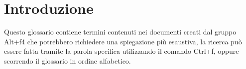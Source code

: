 \documentclass[a4paper,12pt]{article}
\begin{document}
\section*{Introduzione}
\label{sec:introduzione}
Questo glossario contiene termini contenuti nei documenti creati dal gruppo Alt+f4 che potrebbero richiedere una spiegazione più esaustiva,
 la ricerca può essere fatta tramite la parola specifica utilizzando il comando Ctrl+f, oppure scorrendo il glossario in ordine alfabetico.

\label{sec:glossario}

\printnoidxglossaries
\end{document}
